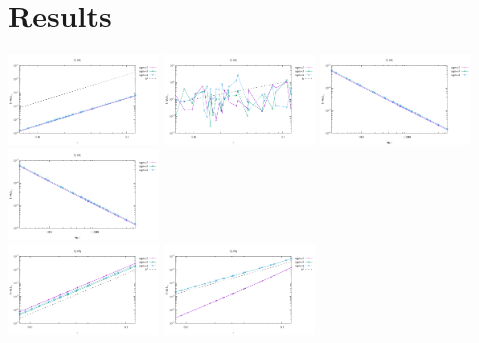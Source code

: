 \newpage
\section*{Results}

\begin{center}
\includegraphics[width=4cm]{python_codes/fieldstone_120/results/Q1Q0-velocity-h.pdf}
\includegraphics[width=4cm]{python_codes/fieldstone_120/results/Q1Q0-pressure-h.pdf}
\includegraphics[width=4cm]{python_codes/fieldstone_120/results/Q1Q0-velocity-Nfem.pdf}
\includegraphics[width=4cm]{python_codes/fieldstone_120/results/Q1Q0-velocity-Nfem.pdf}
\\
\includegraphics[width=4cm]{python_codes/fieldstone_120/results/Q2Q1-velocity-h.pdf}
\includegraphics[width=4cm]{python_codes/fieldstone_120/results/Q2Q1-pressure-h.pdf}

\end{center}
